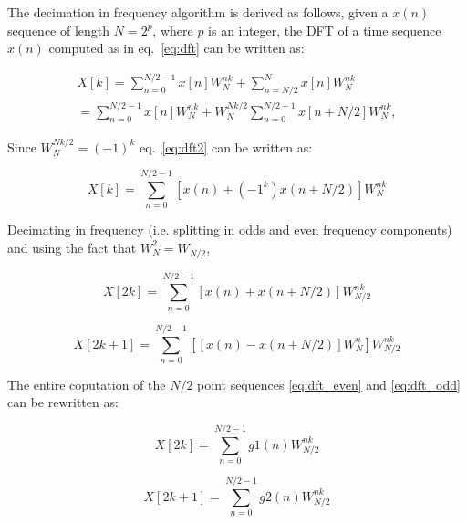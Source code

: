 The decimation in frequency algorithm is derived as follows,  given a $x(n)$ sequence of length $N = 2^p$, where $p$ is an integer, the DFT of a time sequence $x(n)$ computed as in eq.~\ref{eq:dft} can be written as:

\begin{equation} 
\begin{split}
     X[k]=\sum _{n=0}^{N/2-1} x[n]W^{nk}_N + \sum _{n=N/2}^{N} x[n]W^{nk}_N  \\  =\sum _{n=0}^{N/2-1} x[n]W^{nk}_N + W^{Nk/2}_N\sum _{n=0}^{N/2-1} x[n+N/2]W^{nk}_N,
     \label{eq:dft2}
     \end{split}
\end{equation}

 Since ${W}_{N}^{Nk/2} = (-1)^k$ eq.~\ref{eq:dft2} can be written as:

\begin{equation} 
     X[k]=\sum _{n=0}^{N/2-1} [x(n) + (-1^{k})x(n+N/2)]W^{nk}_{N}
\label{eq:dft_even}
\end{equation}

Decimating in frequency (i.e. splitting in odds and even frequency components) and using the fact that ${W}_{N}^{2} = {W}_{N/2}^{}$, 


\begin{equation} 
     X[2k]=\sum _{n=0}^{N/2-1} [x(n) + x(n+N/2)]W^{nk}_{N/2}
\label{eq:dft_even}
\end{equation}


\begin{equation} 
     X[2k +1]=\sum _{n=0}^{N/2-1} [[x(n) - x(n+N/2)]W^{n}_{N}]W^{nk}_{N/2}
\label{eq:dft_odd}
\end{equation}


The entire coputation of the $N/2$ point sequences \ref{eq:dft_even} and \ref{eq:dft_odd} can be rewritten as: 

\begin{equation} 
     X[2k]=\sum _{n=0}^{N/2-1} g1(n)W^{nk}_{N/2}
\label{eq:dft_even2}
\end{equation}

\begin{equation} 
     X[2k+1]=\sum _{n=0}^{N/2-1} g2(n)W^{nk}_{N/2}
\label{eq:dft_odd2}
\end{equation}

